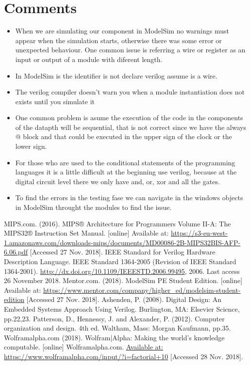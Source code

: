 \documentclass[conference]{IEEEtran}
\begin{document}
\section{Comments}
\begin{itemize}
\item When we are simulating our component in ModelSim no warnings must appear when the 
simulation starts, otherwise there was some error or unexpected behaviour. One common 
issue is referring a wire or register as an input or output of a module with diferent length.
\item In ModelSim is the identifier is not declare verilog assume is a wire.
\item The verilog compiler doesn't warn you when a module  instantiation does not exists until you simulate it
\item One common problem is asume the execution of the code in the components of the datapth will be sequential, 
that is not correct since we have the always @ block and that could be executed in the upper sign of the clock 
or the lower sign.
\item For those who are used to the conditional statements of the programming languages it is a little difficult at the 
beginning use verilog, because at the digital circuit level there we only have and, or, xor and all the gates.
\item To find the errors in the testing fase we can navigate in the windows objects in ModelSim throught the modules
to find the issue.
\end{itemize}

\begin{thebibliography}{00}
 MIPS.com. (2016). MIPS® Architecture for Programmers Volume II-A: The MIPS32® Instruction Set Manual. [online] Available at: \url{https://s3-eu-west-1.amazonaws.com/downloads-mips/documents/MD00086-2B-MIPS32BIS-AFP-6.06.pdf} [Accessed 27 Nov. 2018].
 IEEE Standard for Verilog Hardware Description Language. IEEE Standard 1364-2005 (Revision of IEEE Standard 1364-2001). \url{http://dx.doi.org/10.1109/IEEESTD.2006.99495}, 2006. Last access 26 November 2018.
 Mentor.com. (2018). ModelSim PE Student Edition. [online] Available at: \url{https://www.mentor.com/company/higher_ed/modelsim-student-edition} [Accessed 27 Nov. 2018].
 Ashenden, P. (2008). Digital Design: An Embedded Systems Approach Using Verilog. Burlington, MA: Elsevier Science, pp.22,23.
 Patterson, D., Hennessy, J. and Alexander, P. (2012). Computer organization and design. 4th ed. Waltham, Mass: Morgan Kaufmann, pp.35.
 Wolframalpha.com (2018). Wolfram|Alpha: Making the world’s knowledge computable. [online] Wolframalpha.com. \url{Available at: https://www.wolframalpha.com/input/?i=factorial+10} [Accessed 28 Nov. 2018].
\end{thebibliography}
\vspace{12pt}
\end{document}
